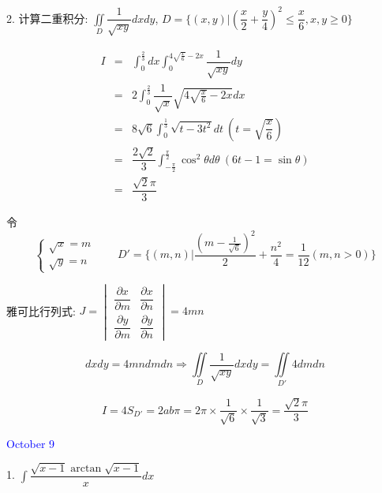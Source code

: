 \begin{solution}
	
\end{solution}



2. 计算二重积分: $\displaystyle{\iint\limits_{D}\dfrac{1}{\sqrt{xy}}dxdy}$, $D = \{(x,y)|(\dfrac{x}{2}+\dfrac{y}{4})^2\leq \dfrac{x}{6},x,y\geq 0\}$

\begin{solution}
	\begin{eqnarray*}
		I & = & \int_{0}^{\frac{2}{3}}dx\int_{0}^{4\sqrt{\frac{x}{6}}-2x}\dfrac{1}{\sqrt{xy}}dy\\
		  & = & 2\int_{0}^{\frac{2}{3}}\dfrac{1}{\sqrt{x}}\sqrt{4\sqrt{\frac{x}{6}}-2x}dx\\
		  & = & 8\sqrt{6}\int_{0}^{\frac{1}{3}}\sqrt{t-3t^2}dt\ (t=\sqrt{\dfrac{x}{6}})\\
		  & = & \dfrac{2\sqrt{2}}{3}\int_{-\frac{\pi}{2}}^{\frac{\pi}{2}}\cos^2\theta d\theta\ (6t-1=\sin\theta)\\
		  & = & \dfrac{\sqrt{2}\pi}{3}
	\end{eqnarray*}
\end{solution}
\begin{anymark}[注]
	令 
	$$\begin{cases}
		\sqrt{x} = m \\
		\sqrt{y} = n
	\end{cases} \quad \quad 
	D' = \{(m,n) |\dfrac{(m-\frac{1}{\sqrt{6}})^2}{2}+\dfrac{n^2}{4}=\dfrac{1}{12}(m,n>0)\}$$
	
	雅可比行列式: $J = 
	\begin{vmatrix}
		\dfrac{\partial x}{\partial m} & \dfrac{\partial x}{\partial n} \\
		\dfrac{\partial y}{\partial m} & \dfrac{\partial y}{\partial n}
	\end{vmatrix} = 4mn$

	$$dxdy = 4mndmdn\Rightarrow \iint\limits_{D}\dfrac{1}{\sqrt{xy}}dxdy = \iint\limits_{D'}4dmdn$$
	
	$$I = 4S_{D'} = 2ab\pi = 2\pi\times\dfrac{1}{\sqrt{6}}\times\dfrac{1}{\sqrt{3}}=\dfrac{\sqrt{2}\pi}{3}$$
\end{anymark}


\textcolor{blue}{October 9}

1. $\displaystyle{\int \dfrac{\sqrt{x-1}\arctan \sqrt{x-1}}{x}dx}$

